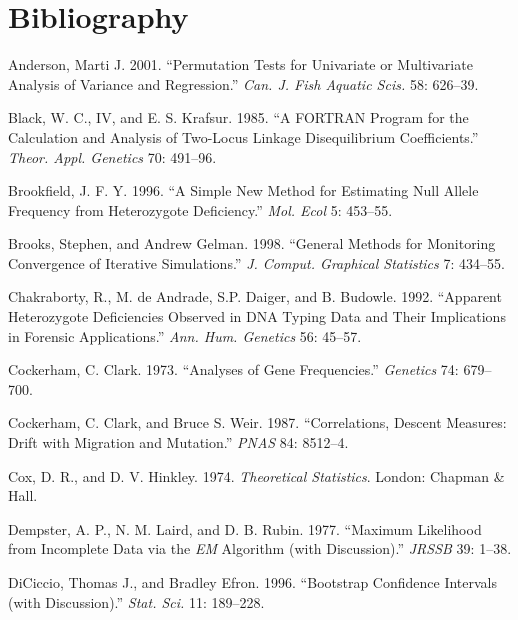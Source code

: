 \documentclass[12pt,]{book}
\begin{document}
\printindex

\chapter*{Bibliography}\label{bibliography}

\hypertarget{refs}{}
\hypertarget{ref-Anderson01}{}
Anderson, Marti J. 2001. ``Permutation Tests for Univariate or
Multivariate Analysis of Variance and Regression.'' \emph{Can. J. Fish
Aquatic Scis.} 58: 626--39.

\hypertarget{ref-BlackK85}{}
Black, W. C., IV, and E. S. Krafsur. 1985. ``A FORTRAN Program for the
Calculation and Analysis of Two-Locus Linkage Disequilibrium
Coefficients.'' \emph{Theor. Appl. Genetics} 70: 491--96.

\hypertarget{ref-Brookfield96}{}
Brookfield, J. F. Y. 1996. ``A Simple New Method for Estimating Null
Allele Frequency from Heterozygote Deficiency.'' \emph{Mol. Ecol} 5:
453--55.

\hypertarget{ref-BrooksG98}{}
Brooks, Stephen, and Andrew Gelman. 1998. ``General Methods for
Monitoring Convergence of Iterative Simulations.'' \emph{J. Comput.
Graphical Statistics} 7: 434--55.

\hypertarget{ref-ChakrabortyADB92}{}
Chakraborty, R., M. de Andrade, S.P. Daiger, and B. Budowle. 1992.
``Apparent Heterozygote Deficiencies Observed in DNA Typing Data and
Their Implications in Forensic Applications.'' \emph{Ann. Hum. Genetics}
56: 45--57.

\hypertarget{ref-Cockerham73}{}
Cockerham, C. Clark. 1973. ``Analyses of Gene Frequencies.''
\emph{Genetics} 74: 679--700.

\hypertarget{ref-CockerhamW87}{}
Cockerham, C. Clark, and Bruce S. Weir. 1987. ``Correlations, Descent
Measures: Drift with Migration and Mutation.'' \emph{PNAS} 84: 8512--4.

\hypertarget{ref-CoxH74}{}
Cox, D. R., and D. V. Hinkley. 1974. \emph{Theoretical Statistics}.
London: Chapman \& Hall.

\hypertarget{ref-DempsterLR77}{}
Dempster, A. P., N. M. Laird, and D. B. Rubin. 1977. ``Maximum
Likelihood from Incomplete Data via the \emph{EM} Algorithm (with
Discussion).'' \emph{JRSSB} 39: 1--38.

\hypertarget{ref-DiCiccioE96}{}
DiCiccio, Thomas J., and Bradley Efron. 1996. ``Bootstrap Confidence
Intervals (with Discussion).'' \emph{Stat. Sci.} 11: 189--228.
\end{document}
